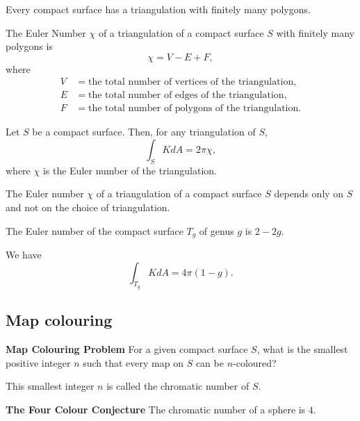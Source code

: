 \begin{theorem}
  Every compact surface has a triangulation with finitely many polygons.
\end{theorem}

\begin{defn}
  The Euler Number $\chi$ of a triangulation of a compact surface $S$ with 
  finitely many polygons is
  \[
    \chi = V - E + F,  
  \]
  where
  \begin{align*}
    V &= \text{the total number of vertices of the triangulation},\\
    E &= \text{the total number of edges of the triangulation},\\
    F &= \text{the total number of polygons of the triangulation}.
  \end{align*}
\end{defn}

\begin{theorem}
  Let $S$ be a compact surface. Then, for any triangulation of $S$,
  \[
    \int_S K dA = 2\pi\chi,
  \]
  where $\chi$ is the Euler number of the triangulation.
\end{theorem}

\begin{corollary}
  The Euler number $\chi$ of a triangulation of a compact surface $S$ depends
  only on $S$ and not on the choice of triangulation.
\end{corollary}

\begin{theorem}
  The Euler number of the compact surface $T_g$ of genus $g$ is $2 - 2g$.
\end{theorem}

\begin{corollary}
  We have
  \[
    \int_{T_g} K dA = 4\pi(1 - g).
  \]
\end{corollary}

\subsection{Map colouring}

\noindent\textbf{Map Colouring Problem} For a given compact surface $S$, what is the smallest
positive integer $n$ such that every map on $S$ can be $n$-coloured?

This smallest integer $n$ is called the chromatic number of $S$.

\noindent\textbf{The Four Colour Conjecture} The chromatic number of a sphere is $4$.


